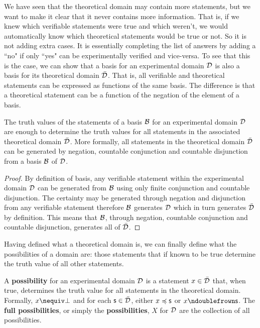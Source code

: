 \documentclass[11pt,letterpaper,fleqn]{memoir} %
\begin{document}
We have seen that the theoretical domain may contain more statements, but we want to make it clear that it never contains more information. That is, if we knew which verifiable statements were true and which weren't, we would automatically know which theoretical statements would be true or not. So it is not adding extra cases. It is essentially completing the list of answers by adding a ``no" if only ``yes" can be experimentally verified and vice-versa. To see that this is the case, we can show that a basis for an experimental domain $\mathcal{D}$ is also a basis for its theoretical domain $\bar{\mathcal{D}}$. That is, all verifiable and theoretical statements can be expressed as functions of the same basis. The difference is that a theoretical statement can be a function of the negation of the element of a basis.

\begin{mathSection}
\begin{prop}\label{prop_basis_for_theoretical_domain}
	The truth values of the statements of a basis $\mathcal{B}$ for an experimental domain $\mathcal{D}$ are enough to determine the truth values for all statements in the associated theoretical domain $\bar{\mathcal{D}}$. More formally, all statements in the theoretical domain $\bar{\mathcal{D}}$ can be generated by negation, countable conjunction and countable disjunction from a basis $\mathcal{B}$ of $\mathcal{D}$.
\end{prop}

\begin{proof}
	By definition of basis, any verifiable statement within the experimental domain $\mathcal{D}$ can be generated from $\mathcal{B}$ using only finite conjunction and countable disjunction. The certainty may be generated through negation and disjunction from any verifiable statement therefore $\mathcal{B}$ generates $\mathcal{D}$ which in turn generates $\bar{\mathcal{D}}$ by definition. This means that $\mathcal{B}$, through negation, countable conjunction and countable disjunction, generates all of $\bar{\mathcal{D}}$.
\end{proof}
\end{mathSection}

Having defined what a theoretical domain is, we can finally define what the possibilities of a domain are: those statements that if known to be true determine the truth value of all other statements.

\begin{mathSection}

\begin{defn}
	A \textbf{possibility} for an experimental domain $\mathcal{D}$ is a statement $x \in \bar{\mathcal{D}}$ that, when true, determines the truth value for all statements in the theoretical domain. Formally, $x \nequiv \impossibility$ and for each $\mathsf{s} \in \bar{\mathcal{D}}$, either $x \preccurlyeq \mathsf{s}$ or $x \ncomp \mathsf{s}$. The \textbf{full possibilities}, or simply the \textbf{possibilities}, $X$ for $\mathcal{D}$ are the collection of all possibilities.
\end{defn}

\end{mathSection}
\end{document}
